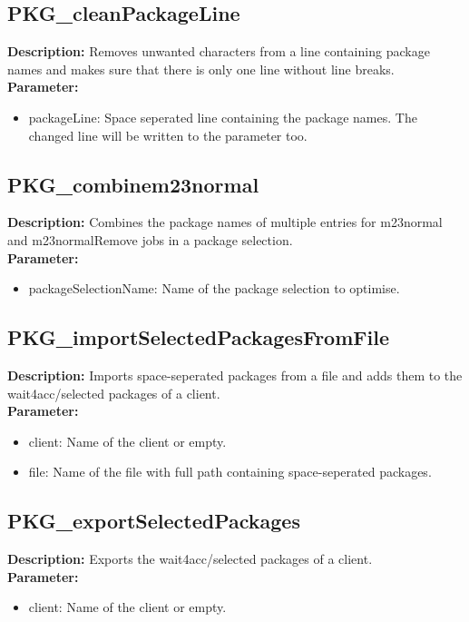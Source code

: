 \subsection{PKG\_cleanPackageLine}
\textbf{Description:} Removes unwanted characters from a line containing package names and makes sure that there is only one line without line breaks.\\
\textbf{Parameter:}
\begin{itemize}
\item packageLine: Space seperated line containing the package names. The changed line will be written to the parameter too.
\end{itemize}

\subsection{PKG\_combinem23normal}
\textbf{Description:} Combines the package names of multiple entries for m23normal and m23normalRemove jobs in a package selection.\\
\textbf{Parameter:}
\begin{itemize}
\item packageSelectionName: Name of the package selection to optimise.
\end{itemize}

\subsection{PKG\_importSelectedPackagesFromFile}
\textbf{Description:} Imports space-seperated packages from a file and adds them to the wait4acc/selected packages of a client.\\
\textbf{Parameter:}
\begin{itemize}
\item client: Name of the client or empty.
\item file: Name of the file with full path containing space-seperated packages.
\end{itemize}

\subsection{PKG\_exportSelectedPackages}
\textbf{Description:} Exports the wait4acc/selected packages of a client.\\
\textbf{Parameter:}
\begin{itemize}
\item client: Name of the client or empty.
\end{itemize}

